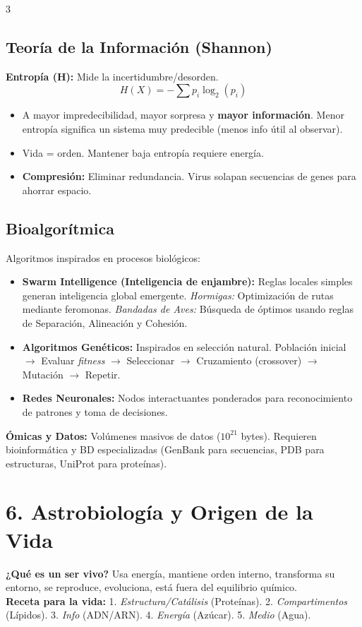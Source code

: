 \documentclass[9pt,letterpaper]{extarticle}
\begin{document}
\begin{multicols*}{3}
	\subsection*{Teoría de la Información (Shannon)}
	\textbf{Entropía (H):} Mide la incertidumbre/desorden.
	\[ H(X) = - \sum p_i \log_2(p_i) \]
	\begin{itemize}
		\item A mayor impredecibilidad, mayor sorpresa y \textbf{mayor información}. Menor entropía significa un sistema muy predecible (menos info útil al observar).
		\item Vida = orden. Mantener baja entropía requiere energía.
		\item \textbf{Compresión:} Eliminar redundancia. Virus solapan secuencias de genes para ahorrar espacio.
	\end{itemize}

	\subsection*{Bioalgorítmica}
	Algoritmos inspirados en procesos biológicos:
	\begin{itemize}
		\item \textbf{Swarm Intelligence (Inteligencia de enjambre):} Reglas locales simples generan inteligencia global emergente. \textit{Hormigas:} Optimización de rutas mediante feromonas. \textit{Bandadas de Aves:} Búsqueda de óptimos usando reglas de Separación, Alineación y Cohesión.
		\item \textbf{Algoritmos Genéticos:} Inspirados en selección natural. Población inicial $\rightarrow$ Evaluar \textit{fitness} $\rightarrow$ Seleccionar $\rightarrow$ Cruzamiento (crossover) $\rightarrow$ Mutación $\rightarrow$ Repetir.
		\item \textbf{Redes Neuronales:} Nodos interactuantes ponderados para reconocimiento de patrones y toma de decisiones.
	\end{itemize}
	\textbf{Ómicas y Datos:} Volúmenes masivos de datos ($10^{21}$ bytes). Requieren bioinformática y BD especializadas (GenBank para secuencias, PDB para estructuras, UniProt para proteínas).

    
	\section*{6. Astrobiología y Origen de la Vida}
	\textbf{¿Qué es un ser vivo?} Usa energía, mantiene orden interno, transforma su entorno, se reproduce, evoluciona, está fuera del equilibrio químico. \\
	\textbf{Receta para la vida:} 1. \textit{Estructura/Catálisis} (Proteínas). 2. \textit{Compartimentos} (Lípidos). 3. \textit{Info} (ADN/ARN). 4. \textit{Energía} (Azúcar). 5. \textit{Medio} (Agua).


\end{multicols*}
\end{document}

